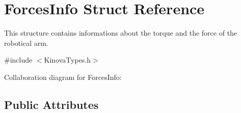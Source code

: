 \hypertarget{struct_forces_info}{}\section{Forces\+Info Struct Reference}
\label{struct_forces_info}


This structure contains informations about the torque and the force of the robotical arm.  




{\ttfamily \#include $<$Kinova\+Types.\+h$>$}



Collaboration diagram for Forces\+Info\+:
\subsection*{Public Attributes}
